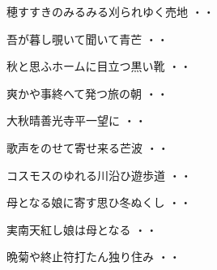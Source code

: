 \begin{shiika}穂すすきのみるみる刈られゆく売地
\hfill{・・}\end{shiika}
\vspace{0.6cm}
\begin{shiika}吾が暮し覗いて聞いて青芒
\hfill{・・}\end{shiika}
\vspace{0.6cm}
\begin{shiika}秋と思ふホームに目立つ黒い靴
\hfill{・・}\end{shiika}
\vspace{0.6cm}
\begin{shiika}爽かや事終へて発つ旅の朝
\hfill{・・}\end{shiika}
\vspace{0.6cm}
\begin{shiika}大秋晴善光寺平一望に
\hfill{・・}\end{shiika}
\vspace{0.6cm}
\begin{shiika}歌声をのせて寄せ来る芒波
\hfill{・・}\end{shiika}
\vspace{0.6cm}
\begin{shiika}コスモスのゆれる川沿ひ遊歩道
\hfill{・・}\end{shiika}
\vspace{0.6cm}
\begin{shiika}母となる娘に寄す思ひ冬ぬくし
\hfill{・・}\end{shiika}
\vspace{0.6cm}
\begin{shiika}実南天紅し娘は母となる
\hfill{・・}\end{shiika}
\vspace{0.6cm}
\begin{shiika}晩菊や終止符打たん独り住み
\hfill{・・}\end{shiika}
\vspace{0.6cm}
